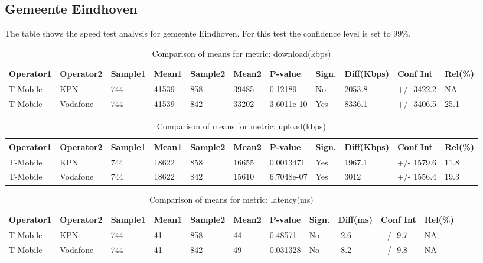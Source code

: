 \documentclass[]{article}
\begin{document}
\normalsize

\newpage

\subsection{Gemeente Eindhoven}\label{gemeente-eindhoven}

The table shows the speed test analysis for gemeente Eindhoven. For this
test the confidence level is set to 99\%.

\begin{table}[ht]
\centering
{\footnotesize
\begin{tabular}{lllllllllll}
  \hline
Operator1 & Operator2 & Sample1 & Mean1 & Sample2 & Mean2 & P-value & Sign. & Diff(Kbps) & Conf Int & Rel(\%) \\ 
  \hline
T-Mobile & KPN & 744 & 41539 & 858 & 39485 & 0.12189 & No & 2053.8 & +/- 3422.2 & NA \\ 
  T-Mobile & Vodafone & 744 & 41539 & 842 & 33202 & 3.6011e-10 & Yes & 8336.1 & +/- 3406.5 & 25.1 \\ 
   \hline
\end{tabular}
}
\caption{Comparison of means for metric: download(kbps)} 
\end{table}\begin{table}[ht]
\centering
{\footnotesize
\begin{tabular}{lllllllllll}
  \hline
Operator1 & Operator2 & Sample1 & Mean1 & Sample2 & Mean2 & P-value & Sign. & Diff(Kbps) & Conf Int & Rel(\%) \\ 
  \hline
T-Mobile & KPN & 744 & 18622 & 858 & 16655 & 0.0013471 & Yes & 1967.1 & +/- 1579.6 & 11.8 \\ 
  T-Mobile & Vodafone & 744 & 18622 & 842 & 15610 & 6.7048e-07 & Yes & 3012 & +/- 1556.4 & 19.3 \\ 
   \hline
\end{tabular}
}
\caption{Comparison of means for metric: upload(kbps)} 
\end{table}\begin{table}[ht]
\centering
{\footnotesize
\begin{tabular}{lllllllllll}
  \hline
Operator1 & Operator2 & Sample1 & Mean1 & Sample2 & Mean2 & P-value & Sign. & Diff(ms) & Conf Int & Rel(\%) \\ 
  \hline
T-Mobile & KPN & 744 & 41 & 858 & 44 & 0.48571 & No & -2.6 & +/- 9.7 & NA \\ 
  T-Mobile & Vodafone & 744 & 41 & 842 & 49 & 0.031328 & No & -8.2 & +/- 9.8 & NA \\ 
   \hline
\end{tabular}
}
\caption{Comparison of means for metric: latency(ms)} 
\end{table}
\end{document}
